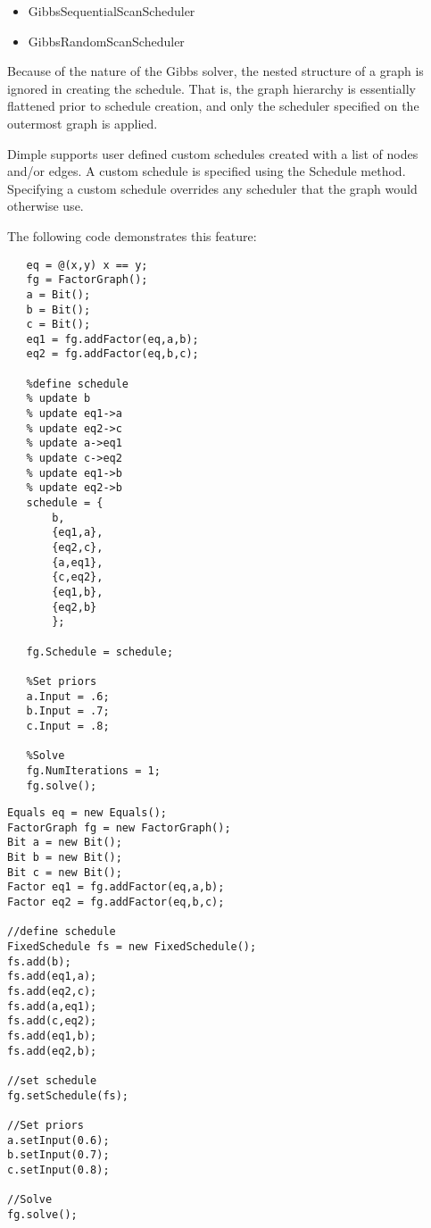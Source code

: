 \begin{itemize}
\item GibbsSequentialScanScheduler
\item GibbsRandomScanScheduler
\end{itemize}

Because of the nature of the Gibbs solver, the nested structure of a graph is ignored in creating the schedule.  That is, the graph hierarchy is essentially flattened prior to schedule creation, and only the scheduler specified on the outermost graph is applied.


\label{sec:CustomSchedules}


Dimple supports user defined custom schedules created with a list of nodes and/or edges.  A custom schedule is specified using the Schedule method.  Specifying a custom schedule overrides any scheduler that the graph would otherwise use.

The following code demonstrates this feature:

\ifmatlab

\begin{lstlisting}
   eq = @(x,y) x == y;
   fg = FactorGraph();
   a = Bit();
   b = Bit();
   c = Bit();
   eq1 = fg.addFactor(eq,a,b);
   eq2 = fg.addFactor(eq,b,c);
   
   %define schedule
   % update b
   % update eq1->a
   % update eq2->c
   % update a->eq1
   % update c->eq2
   % update eq1->b
   % update eq2->b
   schedule = {
       b,
       {eq1,a},
       {eq2,c},
       {a,eq1},
       {c,eq2},
       {eq1,b},
       {eq2,b}
       };
   
   fg.Schedule = schedule;
   
   %Set priors
   a.Input = .6;
   b.Input = .7;
   c.Input = .8;
   
   %Solve
   fg.NumIterations = 1;
   fg.solve();
\end{lstlisting}

\fi

\ifjava
\begin{lstlisting}
Equals eq = new Equals();
FactorGraph fg = new FactorGraph();
Bit a = new Bit();
Bit b = new Bit();
Bit c = new Bit();
Factor eq1 = fg.addFactor(eq,a,b);
Factor eq2 = fg.addFactor(eq,b,c);

//define schedule
FixedSchedule fs = new FixedSchedule();
fs.add(b);
fs.add(eq1,a);
fs.add(eq2,c);
fs.add(a,eq1);
fs.add(c,eq2);
fs.add(eq1,b);
fs.add(eq2,b);
		
//set schedule
fg.setSchedule(fs);

//Set priors
a.setInput(0.6);
b.setInput(0.7);
c.setInput(0.8);

//Solve
fg.solve();
\end{lstlisting}
\fi

